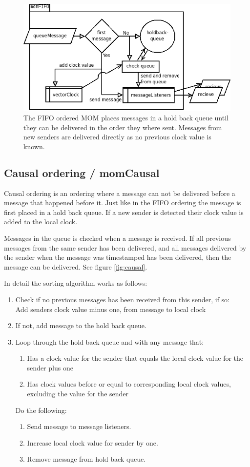 \documentclass[english]{article}
\begin{document}
\begin{figure}
\includegraphics[width=\textwidth]{momFIFO.png}
\caption{The FIFO ordered MOM places messages in a hold back queue until they can be delivered in the order they where sent. Messages from new senders are delivered directly as no previous clock value is known.}
\label{fig:fifo}
\end{figure}

\subsection{Causal ordering / momCausal}
\label{mo-causal}
Causal ordering is an ordering where a message can not be delivered before a message that happened before it. Just like in the FIFO ordering the message is first placed in a hold back queue. If a new sender is detected their clock value is added to the local clock.

Messages in the queue is checked when a message is received. If all previous messages from the same sender has been delivered, and all messages delivered by the sender when the message was timestamped has been delivered, then the message can be delivered. See figure \vref{fig:causal}.

In detail the sorting algorithm works as follows:
\begin{enumerate}
\item Check if no previous messages has been received from this sender, if so:\\
	Add senders clock value minus one, from message to local clock
\item If not, add message to the hold back queue.
\item Loop through the hold back queue and with any message that:
	\begin{enumerate}
	\item Has a clock value for the sender that equals the local clock value for the sender plus one
	\item Has clock values before or equal to corresponding local clock values, excluding the value for the sender
	\end{enumerate}
	Do the following:
	\begin{enumerate}
	\item Send message to message listeners.
	\item Increase local clock value for sender by one.
	\item Remove message from hold back queue.
	\end{enumerate}
\end{enumerate}
\end{document}
